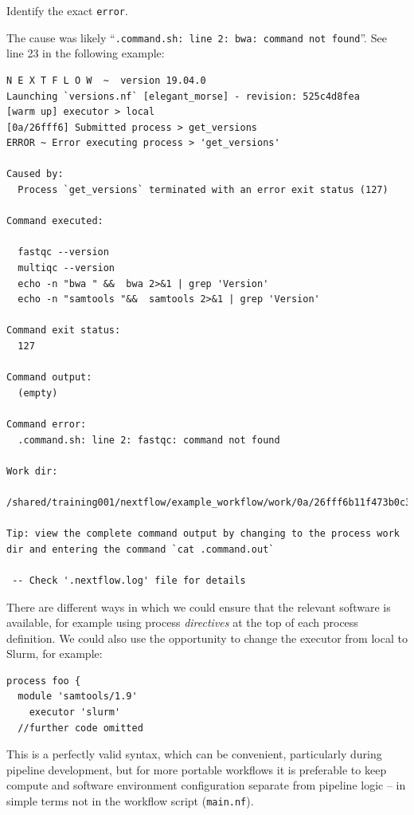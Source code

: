 \begin{questions}
Identify the exact \texttt{error}. 
\begin{answer}
The cause was likely ``\texttt{.command.sh: line 2: bwa: command not found}''. 
See line 23 in the following example:

\begin{lstlisting}
N E X T F L O W  ~  version 19.04.0
Launching `versions.nf` [elegant_morse] - revision: 525c4d8fea
[warm up] executor > local
[0a/26fff6] Submitted process > get_versions
ERROR ~ Error executing process > 'get_versions'

Caused by:
  Process `get_versions` terminated with an error exit status (127)

Command executed:

  fastqc --version
  multiqc --version
  echo -n "bwa " &&  bwa 2>&1 | grep 'Version'
  echo -n "samtools "&&  samtools 2>&1 | grep 'Version'

Command exit status:
  127

Command output:
  (empty)

Command error:
  .command.sh: line 2: fastqc: command not found

Work dir:
  /shared/training001/nextflow/example_workflow/work/0a/26fff6b11f473b0c3f0b3961608462

Tip: view the complete command output by changing to the process work dir and entering the command `cat .command.out`

 -- Check '.nextflow.log' file for details

\end{lstlisting}
\end{answer}
\end{questions}


There are different ways in which we could ensure that the relevant software is available, for example using process 
\emph{directives} at the top of each process definition. We could also use the opportunity to change the executor from local to Slurm, for example:
\begin{lstlisting}
process foo {
  module 'samtools/1.9' 
    executor 'slurm' 
  //further code omitted 
\end{lstlisting}

This is a perfectly valid syntax, which can be convenient, particularly during pipeline development, 
but for more portable workflows it is preferable to keep compute and software environment configuration 
separate from pipeline logic -- in simple terms not in the workflow script (\texttt{main.nf}).

